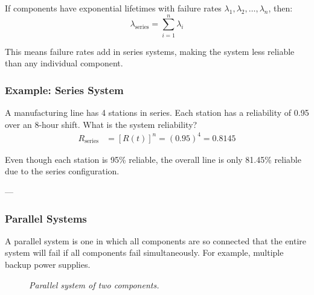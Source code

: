 \documentclass[twoside]{book}
\begin{document}
If components have exponential lifetimes with failure rates $\lambda_1, \lambda_2, \ldots, \lambda_n$, then:
\begin{equation*}
\lambda_{\text{series}} = \sum_{i=1}^n \lambda_i
\end{equation*}

This means failure rates add in series systems, making the system less reliable than any individual component.

\subsubsection{Example: Series System}

A manufacturing line has 4 stations in series. Each station has a reliability of 0.95 over an 8-hour shift. What is the system reliability?
\begin{align*}
R_{\text{series}} &= [R(t)]^n = (0.95)^4 = 0.8145
\end{align*}

Even though each station is 95\% reliable, the overall line is only 81.45\% reliable due to the series configuration.

---

\subsubsection{Parallel Systems}

A parallel system is one in which all components are so connected
that the entire system will fail if all components fail simultaneously. For example, multiple backup power supplies.

\begin{figure}[H]
\begin{center}
\end{center}
\caption{\textit{Parallel system of two components.}}
\end{figure}
\end{document}
